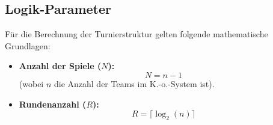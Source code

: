 \subsection{Logik-Parameter}
Für die Berechnung der Turnierstruktur gelten folgende mathematische Grundlagen:

\begin{itemize}
    \item \textbf{Anzahl der Spiele ($N$):} 
    \[ N = n - 1 \] 
    (wobei $n$ die Anzahl der Teams im K.-o.-System ist).
    
    \item \textbf{Rundenanzahl ($R$):} 
    \[ R = \lceil \log_2(n) \rceil \]
\end{itemize}